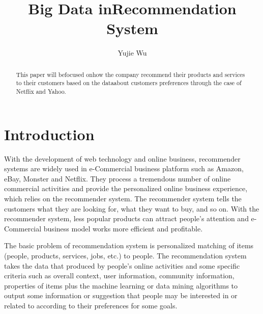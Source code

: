 \documentclass[sigconf]{acmart}
\begin{document}
\title{Big Data inRecommendation System}


\author{Yujie Wu}



\renewcommand{\shortauthors}{B. Trovato et al.}


\begin{abstract}
\large This paper will befocused onhow the company recommend their products and services to their customers based on the dataabout customer\textquotesingle s preferences through the case of Netflix and Yahoo. 
\end{abstract}


\maketitle

\section{Introduction}
\large With the development of web technology and online business, recommender systems are widely used in e-Commercial business platform such as Amazon, eBay, Monster and Netflix. They process a tremendous number of online commercial activities and provide the personalized online business experience, which relies on the recommender system.  The recommender system tells the customers what they are looking for, what they want to buy, and so on. With the recommender system, less popular products can attract people’s attention and e-Commercial business model works more efficient and profitable. 
\par
The basic problem of recommendation system is personalized matching of items (people, products, services, jobs, etc.) to people\cite{Reco1}. The recommendation system takes the data that produced by people’s online activities and some specific criteria such as overall context, user information, community information, properties of items plus the machine learning or data mining algorithms to output some information or suggestion that people may be interested in or related to according to their preferences for some goals\cite{Reco1}. 
\end{document}
